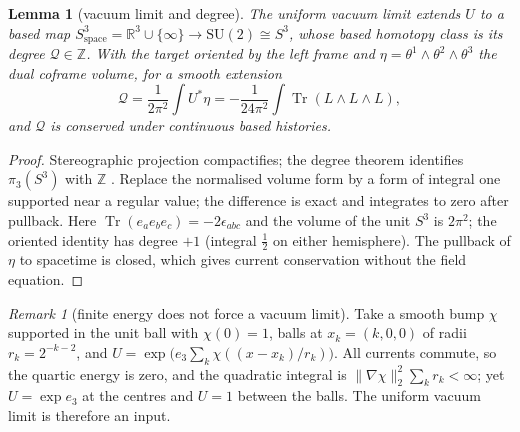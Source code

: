 \documentclass[aps,pra,onecolumn,superscriptaddress,nofootinbib,10pt]{revtex4-2}
\newtheorem{lemma}[theorem]{Lemma}
\theoremstyle{definition}
\theoremstyle{remark}
\newtheorem{remark}[theorem]{Remark}
\newcommand{\R}{\mathbb{R}}
\newcommand{\Z}{\mathbb{Z}}
\newcommand{\tr}{\operatorname{Tr}}
\newcommand{\SU}{\mathrm{SU}}
\begin{document}
\begin{lemma}[vacuum limit and degree]\label{lem:skdegree}
The uniform vacuum limit extends $U$ to a based map $S^3_{\mathrm{space}}=\R^3\cup\{\infty\}\to\SU(2)\cong S^3$, whose based homotopy
class is its degree $\mathcal Q\in\Z$.  With the target oriented by the left frame and $\eta=\theta^1\wedge\theta^2\wedge\theta^3$ the dual
coframe volume, for a smooth extension
\begin{equation}\label{eq:skdegree}
\mathcal Q=\frac1{2\pi^2}\int U^*\eta=-\frac1{24\pi^2}\int\tr(L\wedge L\wedge L),
\end{equation}
and $\mathcal Q$ is conserved under continuous based histories.
\end{lemma}
\begin{proof}
Stereographic projection compactifies; the degree theorem identifies $\pi_3(S^3)$ with $\Z$ \cite[\S\S2.2, 4.2]{n6:hatcher}.
Replace the normalised volume form by a form of integral one supported near a regular value; the
difference is exact and integrates to zero after pullback.  Here $\tr(e_ae_be_c)=-2\epsilon_{abc}$ and the volume of the
unit $S^3$ is $2\pi^2$; the oriented identity has degree $+1$ (integral $\tfrac12$ on either hemisphere).  The
pullback of $\eta$ to spacetime is closed, which gives current conservation without the field equation.
\end{proof}
\begin{remark}[finite energy does not force a vacuum limit]\label{rem:novacuumlimit}
Take a smooth bump $\chi$ supported in the unit ball with $\chi(0)=1$, balls at $x_k=(k,0,0)$ of radii $r_k=2^{-k-2}$, and
$U=\exp\bigl(e_3\sum_k\chi((x-x_k)/r_k)\bigr)$.  All currents commute, so the quartic energy is zero, and the quadratic
integral is $\lVert\nabla\chi\rVert_2^2\sum_kr_k<\infty$; yet $U=\exp e_3$ at the centres and $U=1$ between the balls.  The uniform
vacuum limit is therefore an input.
\end{remark}
\end{document}
